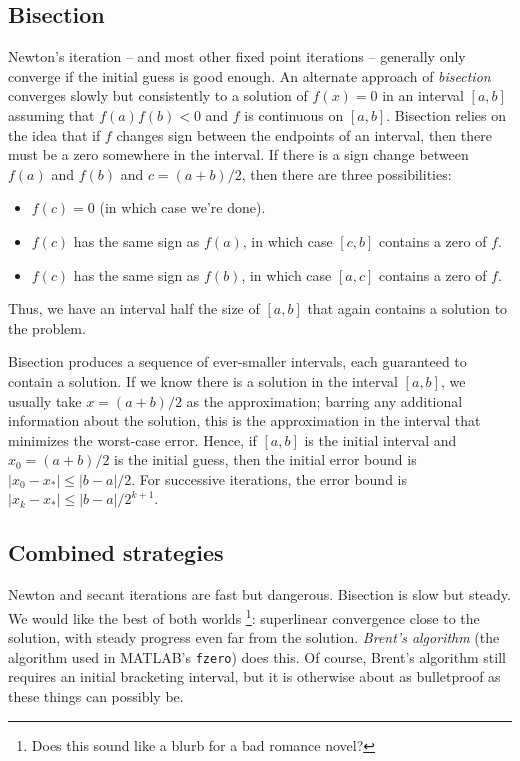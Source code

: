 \documentclass[12pt, leqno]{article}
\begin{document}
\subsection{Bisection}

Newton's iteration -- and most other fixed point iterations --
generally only converge if the initial guess is good enough.  An
alternate approach of {\em bisection} converges slowly but
consistently to a solution of $f(x) = 0$ in an interval $[a,b]$
assuming that $f(a) f(b) < 0$ and $f$ is continuous on $[a,b]$.
Bisection relies on the idea that if $f$ changes sign between
the endpoints of an interval, then there must be a zero somewhere
in the interval.  If there is a sign change between $f(a)$ and $f(b)$
and $c = (a+b)/2$, then there are three possibilities:
\begin{itemize}
\item $f(c) = 0$ (in which case we're done).
\item $f(c)$ has the same sign as $f(a)$, in which case $[c,b]$
  contains a zero of $f$.
\item $f(c)$ has the same sign as $f(b)$, in which case $[a,c]$
  contains a zero of $f$.
\end{itemize}
Thus, we have an interval half the size of $[a,b]$ that again
contains a solution to the problem.

Bisection produces a sequence of ever-smaller intervals, each
guaranteed to contain a solution.  If we know there is a solution
in the interval $[a,b]$, we usually take $x = (a+b)/2$ as the
approximation; barring any additional information about the solution,
this is the approximation in the interval that minimizes the
worst-case error.  Hence, if $[a,b]$ is the initial interval and
$x_0 = (a+b)/2$ is the initial guess, then the initial error bound is
$|x_0-x_*| \leq |b-a|/2$.  For successive iterations, the error bound
is $|x_k-x_*| \leq |b-a|/2^{k+1}$.

\subsection{Combined strategies}

Newton and secant iterations are fast but dangerous.  Bisection is
slow but steady.  We would like the best of both worlds%
\footnote{Does this sound like a blurb for a bad romance novel?}:
superlinear convergence close to the solution, with steady progress
even far from the solution.  {\em Brent's algorithm} (the algorithm
used in MATLAB's {\tt fzero}) does this.  Of course, Brent's algorithm
still requires an initial bracketing interval, but it is otherwise
about as bulletproof as these things can possibly be.
\end{document}
